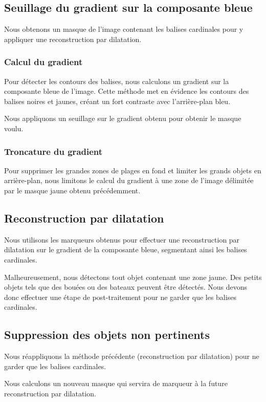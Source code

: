 \documentclass{article}
\begin{document}
\subsection{Seuillage du gradient sur la composante bleue}

Nous obtenons un masque de l'image contenant les balises cardinales pour y
appliquer une reconstruction par dilatation.

\subsubsection{Calcul du gradient}
Pour détecter les contours des balises, nous calculons un gradient sur la
composante bleue de l'image. Cette méthode met en évidence les contours des
balises noires et jaunes, créant un fort contraste avec l'arrière-plan bleu.

Nous appliquons un seuillage sur le gradient obtenu pour obtenir le masque
voulu.

\subsubsection{Troncature du gradient}
Pour supprimer les grandes zones de plages en fond et limiter les grands objets
en arrière-plan, nous limitons le calcul du gradient à une zone de l'image
délimitée par le masque jaune obtenu précédemment.

\subsection{Reconstruction par dilatation}

Nous utilisons les marqueurs obtenus pour effectuer une reconstruction par
dilatation sur le gradient de la composante bleue, segmentant ainsi les balises
cardinales.

Malheureusement, nous détectons tout objet contenant une zone jaune. Des petits
objets tels que des bouées ou des bateaux peuvent être détectés. Nous devons
donc effectuer une étape de post-traitement pour ne garder que les balises
cardinales.

\subsection{Suppression des objets non pertinents}

Nous réappliquons la méthode précédente (reconstruction par dilatation) pour ne
garder que les balises cardinales.

Nous calculons un nouveau masque qui servira de marqueur à la future
reconstruction par dilatation.
\end{document}
